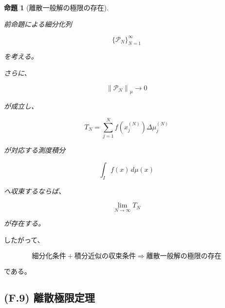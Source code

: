 \documentclass[a4paper,11pt]{article}
\newtheorem{proposition}[definition]{命題}
\begin{document}
\begin{proposition}[離散一般解の極限の存在]
\label{prop:F-limit-existence}

前命題による細分化列

\begin{equation}
    \{\mathcal{P}_N\}_{N=1}^{\infty}
\end{equation}

を考える。

さらに、

\begin{equation}
    \left\|
    \mathcal{P}_N
    \right\|_\mu
    \longrightarrow0
\end{equation}

が成立し、

\begin{equation}
    T_N
    =
    \sum_{j=1}^{N}
    f\!\left(x_j^{(N)}\right)
    \Delta\mu_j^{(N)}
\end{equation}

が対応する測度積分

\begin{equation}
    \int_I f(x)\,d\mu(x)
\end{equation}

へ収束するならば、

\begin{equation}
    \lim_{N\to\infty}T_N
\end{equation}

が存在する。
\end{proposition}

したがって、

\begin{equation}
    \boxed{
        \text{細分化条件}
        +
        \text{積分近似の収束条件}
        \Longrightarrow
        \text{離散一般解の極限の存在}
    }
\end{equation}

である。


\subsection{(F.9) 離散極限定理}
\label{subsec:F9}
\end{document}
